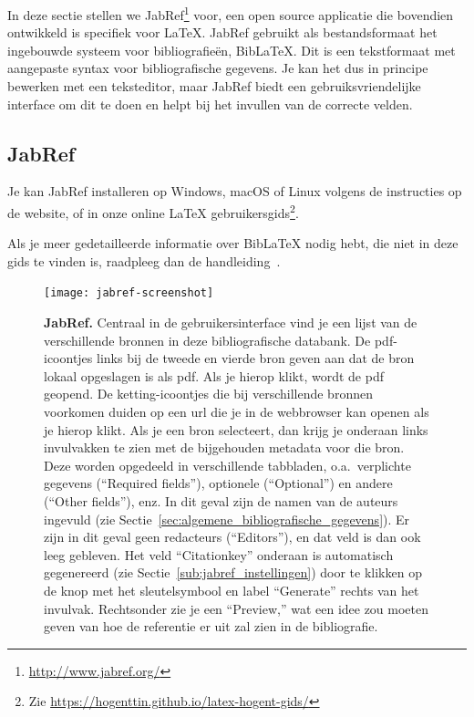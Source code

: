 In deze sectie stellen we JabRef\footnote{\url{http://www.jabref.org/}} voor, een open source applicatie die bovendien ontwikkeld is specifiek voor {\LaTeX}. JabRef gebruikt als bestandsformaat het ingebouwde systeem voor bibliografieën, Bib{\LaTeX}. Dit is een tekstformaat met aangepaste syntax voor bibliografische gegevens. Je kan het dus in principe bewerken met een teksteditor, maar JabRef biedt een gebruiksvriendelijke interface om dit te doen en helpt bij het invullen van de correcte velden.

\subsection{JabRef}%
\label{ssec:jabref}

Je kan JabRef installeren op Windows, macOS of Linux volgens de instructies op de website, of in onze online {\LaTeX} gebruikersgids\footnote{Zie \url{https://hogenttin.github.io/latex-hogent-gids/}}.

Als je meer gedetailleerde informatie over Bib{\LaTeX} nodig hebt, die niet in deze gids te vinden is, raadpleeg dan de handleiding~\autocite{LehmanEtAl2016}.

\begin{figure}
  \centering
  \texttt{[image: jabref-screenshot]}
  \caption[JabRef]{\label{fig:jabref}\textbf{JabRef.} Centraal in de gebruikersinterface vind je een lijst van de verschillende bronnen in deze bibliografische databank. De pdf-icoontjes links bij de tweede en vierde bron geven aan dat de bron lokaal opgeslagen is als pdf. Als je hierop klikt, wordt de pdf geopend. De ketting-icoontjes die bij verschillende bronnen voorkomen duiden op een url die je in de webbrowser kan openen als je hierop klikt. Als je een bron selecteert, dan krijg je onderaan links invulvakken te zien met de bijgehouden metadata voor die bron. Deze worden opgedeeld in verschillende tabbladen, o.a.~verplichte gegevens (``Required fields''), optionele (``Optional'') en andere (``Other fields''), enz. In dit geval zijn de namen van de auteurs ingevuld (zie Sectie~\ref{sec:algemene_bibliografische_gegevens}). Er zijn in dit geval geen redacteurs (``Editors''), en dat veld is dan ook leeg gebleven. Het veld ``Citationkey'' onderaan is automatisch gegenereerd (zie Sectie~\ref{sub:jabref_instellingen}) door te klikken op de knop met het sleutelsymbool en label ``Generate'' rechts van het invulvak. Rechtsonder zie je een ``Preview,'' wat een idee zou moeten geven van hoe de referentie er uit zal zien in de bibliografie.}

\end{figure}

